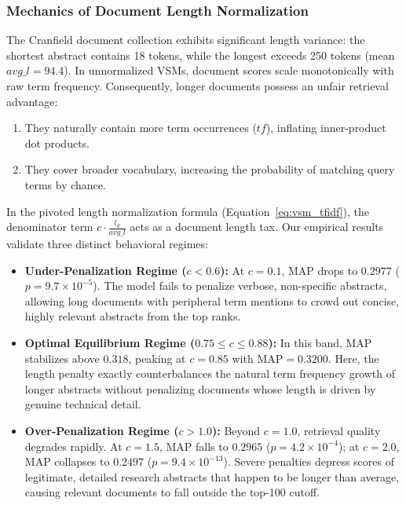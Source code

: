 \documentclass[10pt, a4paper]{article}
\begin{document}
\subsubsection{Mechanics of Document Length Normalization}
The Cranfield document collection exhibits significant length variance: the shortest abstract contains 18 tokens, while the longest exceeds 250 tokens (mean $avg\_l = 94.4$). In unnormalized VSMs, document scores scale monotonically with raw term frequency. Consequently, longer documents possess an unfair retrieval advantage:
\begin{enumerate}[noitemsep,topsep=2pt]
    \item They naturally contain more term occurrences ($tf$), inflating inner-product dot products.
    \item They cover broader vocabulary, increasing the probability of matching query terms by chance.
\end{enumerate}

In the pivoted length normalization formula (Equation~\ref{eq:vsm_tfidf}), the denominator term $c \cdot \frac{l_d}{avg\_l}$ acts as a document length tax. Our empirical results validate three distinct behavioral regimes:
\begin{itemize}[noitemsep,topsep=2pt]
    \item \textbf{Under-Penalization Regime ($c < 0.6$):} At $c=0.1$, MAP drops to $0.2977$ ($p = 9.7 \times 10^{-5}$). The model fails to penalize verbose, non-specific abstracts, allowing long documents with peripheral term mentions to crowd out concise, highly relevant abstracts from the top ranks.
    \item \textbf{Optimal Equilibrium Regime ($0.75 \le c \le 0.88$):} In this band, MAP stabilizes above $0.318$, peaking at $c=0.85$ with $\text{MAP} = \mathbf{0.3200}$. Here, the length penalty exactly counterbalances the natural term frequency growth of longer abstracts without penalizing documents whose length is driven by genuine technical detail.
    \item \textbf{Over-Penalization Regime ($c > 1.0$):} Beyond $c=1.0$, retrieval quality degrades rapidly. At $c=1.5$, MAP falls to $0.2965$ ($p = 4.2 \times 10^{-4}$); at $c=2.0$, MAP collapses to $0.2497$ ($p = 9.4 \times 10^{-13}$). Severe penalties depress scores of legitimate, detailed research abstracts that happen to be longer than average, causing relevant documents to fall outside the top-100 cutoff.
\end{itemize}
\end{document}
